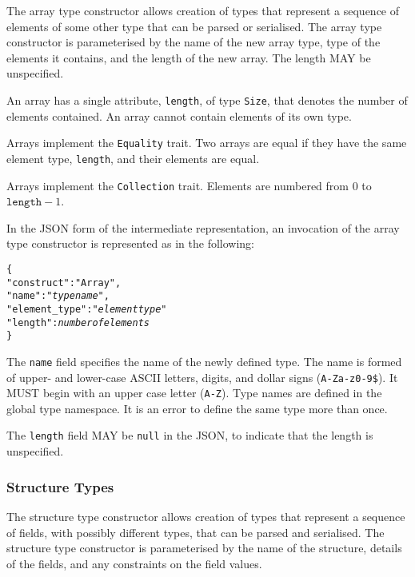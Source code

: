\documentclass[10pt,twocolumn,a4paper]{article}
\newcommand{\code}[1]{\texttt{#1}}
\begin{document}
The array type constructor allows creation of types that represent a
sequence of elements of some other type that can be parsed or serialised.
The array type constructor is parameterised by the name of the new array
type, type of the elements it contains, and the length of the new array.
The length MAY be unspecified. 

An array has a single attribute, \code{length}, of type \code{Size}, that
denotes the number of elements contained. An array cannot contain elements
of its own type.

Arrays implement the \code{Equality} trait. Two arrays are equal if they
have the same element type, \code{length}, and their elements are equal.

Arrays implement the \code{Collection} trait. Elements are numbered from $0$ to
$\code{length}-1$.

In the JSON form of the intermediate representation, an invocation of the
array type constructor is represented as in the following:
\footnotesize
\begin{alltt}
  \{
    "construct"    : "Array",
    "name"         : "\emph{type name}",
    "element\_type" : "\emph{element type}"
    "length"       : \emph{number of elements}
  \}
\end{alltt}
\normalsize
The \code{name} field specifies the name of the newly defined type. The
name is formed of upper- and lower-case ASCII letters, digits, and dollar
signs (\code{A-Za-z0-9\$}).  It MUST begin with an upper case letter
(\code{A-Z}). Type names are defined in the global type namespace.
It is an error to define the same type more than once.

The \code{length} field MAY be \code{null} in the JSON, to indicate that
the length is unspecified.

\subsubsection{Structure Types}

The structure type constructor allows creation of types that represent a
sequence of fields, with possibly different types, that can be parsed and
serialised. The structure type constructor is parameterised by the name of
the structure, details of the fields, and any constraints on the field
values.
\end{document}
